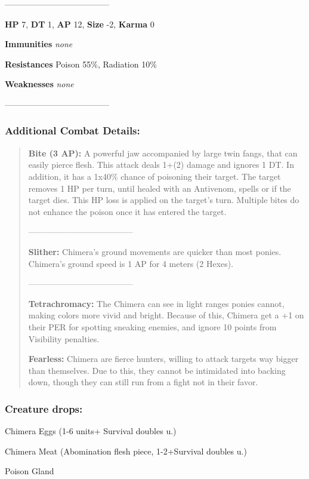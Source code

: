 \documentclass[11pt,a4paper,twocolumn]{book}
\begin{document}
--------------------------------------

\noindent
\textbf{HP} 7, \textbf{DT} 1, \textbf{AP} 12, \textbf{Size} -2, \textbf{Karma} 0


\noindent
\textbf{Immunities} \emph{none}

\noindent
\textbf{Resistances} Poison 55\%, Radiation 10\%

\noindent
\textbf{Weaknesses} \emph{none} %

--------------------------------------
	
	\subsubsection*{Additional Combat Details:}
	\begin{verse}
		\textbf{Bite (3 AP):} A powerful jaw accompanied by large twin fangs, that can easily pierce flesh. This attack deals 1+(2) damage and ignores 1 DT. In addition, it has a 1x40\% chance of poisoning their target. The target removes 1 HP per turn, until healed with an Antivenom, spells or if the target dies. This HP loss is applied on the target's turn. Multiple bites do not enhance the poison once it has entered the target.
		
		--------------------------------------
		
		\textbf{Slither:} Chimera's ground movements are quicker than most ponies. Chimera's ground speed is 1 AP for 4 meters (2 Hexes).
		
		--------------------------------------
		
		\textbf{Tetrachromacy:} The Chimera can see in light ranges ponies cannot, making colors more vivid and bright. Because of this, Chimera get a +1 on their PER for spotting sneaking enemies, and ignore 10 points from Visibility penalties.
		
		\textbf{Fearless:} Chimera are fierce hunters, willing to attack targets way bigger than themselves. Due to this, they cannot be intimidated into backing down, though they can still run from a fight not in their favor.
		
	\end{verse}
	
	\subsubsection*{Creature drops:}
	\begin{compactitem}
		\item Chimera Eggs (1-6 units+ Survival doubles u.)
		\item Chimera Meat (Abomination flesh piece, 1-2+Survival doubles u.)
		\item Poison Gland
	\end{compactitem}	
	
\end{document}
